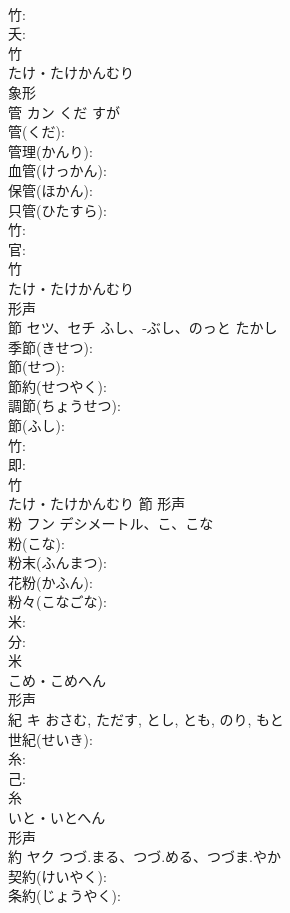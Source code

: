 \documentclass[8pt]{extreport}
\begin{document}
\begin{CJK}{UTF8}{min}
\\	竹: 
\\	夭: 
\\	竹	
\\	たけ・たけかんむり	
\\	象形 
\\	管	カン	くだ	すが	
\\	管(くだ): 
\\	管理(かんり): 
\\	血管(けっかん): 
\\	保管(ほかん): 
\\	只管(ひたすら): 
\\	竹: 
\\	官: 
\\	竹	
\\	たけ・たけかんむり	
\\	形声 
\\	節	セツ、セチ	ふし、-ぶし、のっと	たかし	
\\	季節(きせつ): 
\\	節(せつ): 
\\	節約(せつやく): 
\\	調節(ちょうせつ): 
\\	節(ふし): 
\\	竹: 
\\	即: 
\\	竹	
\\	たけ・たけかんむり	節	形声 
\\	粉	フン	デシメートル、こ、こな		
\\	粉(こな): 
\\	粉末(ふんまつ): 
\\	花粉(かふん): 
\\	粉々(こなごな): 
\\	米: 
\\	分: 
\\	米	
\\	こめ・こめへん	
\\	形声 
\\	紀	キ		おさむ, ただす, とし, とも, のり, もと	
\\	世紀(せいき): 
\\	糸: 
\\	己: 
\\	糸	
\\	いと・いとへん	
\\	形声 
\\	約	ヤク	つづ.まる、つづ.める、つづま.やか		
\\	契約(けいやく): 
\\	条約(じょうやく): 

\end{CJK}
\end{document}
